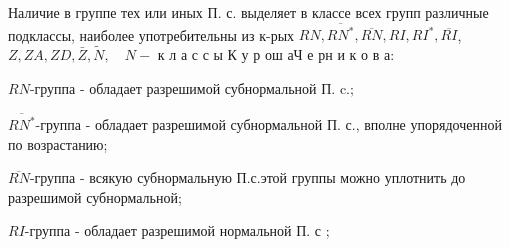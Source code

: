 \documentclass[10pt]{article}
\begin{document}
Наличие в группе тех или иных П. с. выделяет в классе всех групп различные подклассы, наиболее употребительны из к-рых $R N, \overline{R N^{*}}, \overline{R N}, R I, R I^{*}, \overline{R I}$, $Z, Z A, Z D, \bar{Z}, \tilde{N}, \quad N-$ к л а с с ы К у р ош аЧ е рн и к о в а:



$R N$-группа - обладает разрешимой субнормальной П. $\mathrm{c} . ;$



$\overline{R N^{*}}$-группа - обладает разрешимой субнормальной П. с., вполне упорядоченной по возрастанию;



$\overline{R N}$-группа - всякую субнормальную П.с.этой группы можно уплотнить до разрешимой субнормальной;



$R I$-группа - обладает разрешимой нормальной П. с ;
\end{document}
